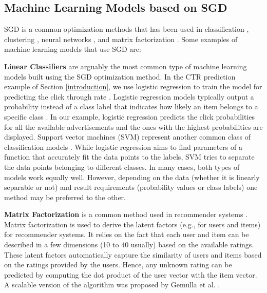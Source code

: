 \documentclass{vldb}
\begin{document}
\subsection{Machine Learning Models based on SGD}
SGD is a common optimization methods that has been used in classification \cite{zhang2004solving}, clustering \cite{bottou1995convergence}, neural networks \cite{dean2012large}, and matrix factorization \cite{funk2006netflix}.
Some examples of machine learning models that use SGD are: 

\textbf{Linear Classifiers} are arguably the most common type of machine learning models built using the SGD optimization method. 
In the CTR prediction example of Section \ref{introduction}, we use logistic regression to train the model for predicting the click through rate \cite{macmahan2013}. 
Logistic regression models typically output a probability instead of a class label that indicates how likely an item belongs to a specific class \cite{hosmer2013applied}.
In our example, logistic regression predicts the click probabilities for all the available advertisements and the ones with the highest probabilities are displayed.
Support vector machines (SVM) represent another common class of classification models \cite{steinwart2008support}.
While logistic regression aims to find parameters of a function that accurately fit the data points to the labels, SVM tries to separate the data points belonging to different classes. 
In many cases, both types of models work equally well.
However, depending on the data (whether it is linearly separable or not) and result requirements (probability values or class labels) one method may be preferred to the other.

\textbf{Matrix Factorization} is a common method used in recommender systems \cite{koren2009matrix}. 
Matrix factorization is used to derive the latent factors (e.g., for users and items) for recommender systems.
It relies on the fact that each user and item can be described in a few dimensions (10 to 40 usually) based on the available ratings.
These latent factors automatically capture the similarity of users and items based on the ratings provided by the users.
Hence, any unknown rating can be predicted by computing the dot product of the user vector with the item vector.
A scalable version of the algorithm was proposed by Gemulla et al. \cite{gemulla2011large}.
\end{document}
